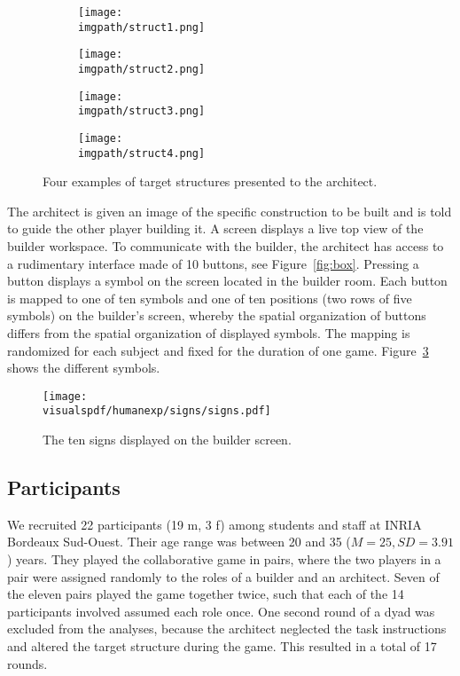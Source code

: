 \begin{figure}[!htbp]
    \centering
    \begin{subfigure}[b]{0.24\columnwidth}
        \centering
        \texttt{[image: \\imgpath/struct1.png]}
        \caption{}
    \end{subfigure}
    \begin{subfigure}[b]{0.74\columnwidth}
        \centering
        \texttt{[image: \\imgpath/struct2.png]}
        \caption{}
    \end{subfigure}
    \begin{subfigure}[b]{0.49\columnwidth}
        \centering
        \texttt{[image: \\imgpath/struct3.png]}
        \caption{}
        \label{fig:sc}
    \end{subfigure}
    \begin{subfigure}[b]{0.49\columnwidth}
        \centering
        \texttt{[image: \\imgpath/struct4.png]}
        \caption{}
    \end{subfigure}
    \caption{Four examples of target structures presented to the architect.} 
    \label{fig:structures}
\end{figure}

The architect is given an image of the specific construction to be built and is told to guide the other player building it. A screen displays a live top view of the builder workspace. To communicate with the builder, the architect has access to a rudimentary interface made of 10 buttons, see Figure~\ref{fig:box}. Pressing a button displays a symbol on the screen located in the builder room. Each button is mapped to one of ten symbols and one of ten positions (two rows of five symbols) on the builder's screen, whereby the spatial organization of buttons differs from the spatial organization of displayed symbols. The mapping is randomized for each subject and fixed for the duration of one game. Figure~\ref{fig:sign} shows the different symbols.

\begin{figure}[!htbp]
\centering
\texttt{[image: \\visualspdf/humanexp/signs/signs.pdf]}
\caption{The ten signs displayed on the builder screen.}
\label{fig:sign}
\end{figure}

\subsection{Participants}

We recruited 22 participants (19 m, 3 f) among students and staff at INRIA Bordeaux Sud-Ouest. Their age range was between 20 and 35 ($M = 25, SD = 3.91$) years. They played the collaborative game in pairs, where the two players in a pair were assigned randomly to the roles of a builder and an architect. Seven of the eleven pairs played the game together twice, such that each of the 14 participants involved assumed each role once. One second round of a dyad was excluded from the analyses, because the architect neglected the task instructions and altered the target structure during the game. This resulted in a total of 17 rounds.

